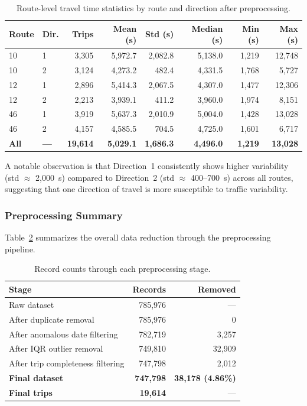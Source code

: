 \begin{table}[htbp]
\centering
\caption{Route-level travel time statistics by route and direction after preprocessing.}
\label{tab:route_level_stats}
\begin{tabular}{llrrrrrr}
\toprule
\textbf{Route} & \textbf{Dir.} & \textbf{Trips} & \textbf{Mean (s)} & \textbf{Std (s)} & \textbf{Median (s)} & \textbf{Min (s)} & \textbf{Max (s)} \\
\midrule
10 & 1 & 3,305 & 5,972.7 & 2,082.8 & 5,138.0 & 1,219 & 12,748 \\
10 & 2 & 3,124 & 4,273.2 & 482.4 & 4,331.5 & 1,768 & 5,727 \\
12 & 1 & 2,896 & 5,414.3 & 2,067.5 & 4,307.0 & 1,477 & 12,306 \\
12 & 2 & 2,213 & 3,939.1 & 411.2 & 3,960.0 & 1,974 & 8,151 \\
46 & 1 & 3,919 & 5,637.3 & 2,010.9 & 5,004.0 & 1,428 & 13,028 \\
46 & 2 & 4,157 & 4,585.5 & 704.5 & 4,725.0 & 1,601 & 6,717 \\
\midrule
\textbf{All} & \textbf{—} & \textbf{19,614} & \textbf{5,029.1} & \textbf{1,686.3} & \textbf{4,496.0} & \textbf{1,219} & \textbf{13,028} \\
\bottomrule
\end{tabular}
\end{table}

A notable observation is that Direction~1 consistently shows higher variability (std $\approx$ 2,000~s) compared to Direction~2 (std $\approx$ 400--700~s) across all routes, suggesting that one direction of travel is more susceptible to traffic variability.

\subsubsection{Preprocessing Summary}
\label{subsubsec:preprocessing_summary}

Table~\ref{tab:preprocessing_summary} summarizes the overall data reduction through the preprocessing pipeline.

\begin{table}[htbp]
\centering
\caption{Record counts through each preprocessing stage.}
\label{tab:preprocessing_summary}
\begin{tabular}{lrr}
\toprule
\textbf{Stage} & \textbf{Records} & \textbf{Removed} \\
\midrule
Raw dataset & 785,976 & — \\
After duplicate removal & 785,976 & 0 \\
After anomalous date filtering & 782,719 & 3,257 \\
After IQR outlier removal & 749,810 & 32,909 \\
After trip completeness filtering & 747,798 & 2,012 \\
\midrule
\textbf{Final dataset} & \textbf{747,798} & \textbf{38,178 (4.86\%)} \\
\textbf{Final trips} & \textbf{19,614} & — \\
\bottomrule
\end{tabular}
\end{table}

